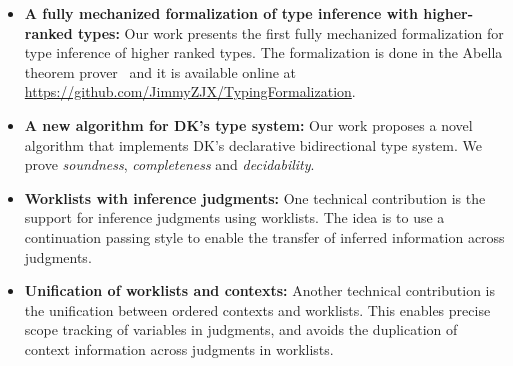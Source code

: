 \begin{itemize}

\item {\bf A fully mechanized formalization of type inference with
  higher-ranked types:} Our work presents the first fully mechanized formalization
  for type inference of higher ranked types. The formalization is done in the
  Abella theorem prover~\cite{AbellaDesc} and it is available
  online at \url{https://github.com/JimmyZJX/TypingFormalization}.

\item {\bf A new algorithm for DK's type system:} Our work proposes a novel algorithm that implements
  DK's declarative bidirectional type system. We prove
  \emph{soundness}, \emph{completeness} and
  \emph{decidability}. 

\item {\bf Worklists with inference judgments:} One technical contribution is the
  support for inference judgments using worklists. The idea is to
  use a continuation passing style to enable the transfer of inferred information across
  judgments. 

\item {\bf Unification of worklists and contexts:} Another technical contribution is the unification
  between ordered contexts and worklists. This enables precise scope tracking
  of variables in judgments, and avoids the duplication of context information across
  judgments in worklists.

\begin{comment}
\jimmy{Notes @20190211 4 points of novalty:\\
1) Dealing with inference judgments and CPS-style chains\\
2) The form of the judgment itself with a single shared context\\
3) The way we deal with scope (which may follow from 2)\\
4) Immediate substitution (judgment list)
}
\end{comment}

\end{itemize}
